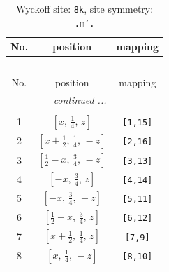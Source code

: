 \documentclass[fleqn,8pt]{jsarticle}
\begin{document}
\begin{longtable}{ccc}
\caption{Wyckoff site: {\tt 8k}, site symmetry: {\tt .m'.}}
 \\
 \hline \hline
No. & position & mapping \\ \hline \endfirsthead

\multicolumn{2}{l}{\tablename\ \thetable{}} \\
 \hline \hline
No. & position & mapping \\ \hline \endhead

 \hline \hline
\multicolumn{2}{r}{\footnotesize\it continued ...} \\ \endfoot

 \hline \hline
\multicolumn{2}{r}{} \\ \endlastfoot

1 & $\left[ x,\, \frac{1}{4},\, z \right]$ & {\tt [1,15]} \\ \hline
2 & $\left[ x + \frac{1}{2},\, \frac{1}{4},\, - z \right]$ & {\tt [2,16]} \\ \hline
3 & $\left[ \frac{1}{2} - x,\, \frac{3}{4},\, - z \right]$ & {\tt [3,13]} \\ \hline
4 & $\left[ - x,\, \frac{3}{4},\, z \right]$ & {\tt [4,14]} \\ \hline
5 & $\left[ - x,\, \frac{3}{4},\, - z \right]$ & {\tt [5,11]} \\ \hline
6 & $\left[ \frac{1}{2} - x,\, \frac{3}{4},\, z \right]$ & {\tt [6,12]} \\ \hline
7 & $\left[ x + \frac{1}{2},\, \frac{1}{4},\, z \right]$ & {\tt [7,9]} \\ \hline
8 & $\left[ x,\, \frac{1}{4},\, - z \right]$ & {\tt [8,10]} \\
\end{longtable}
\renewcommand{\arraystretch}{1.2}
\end{document}
